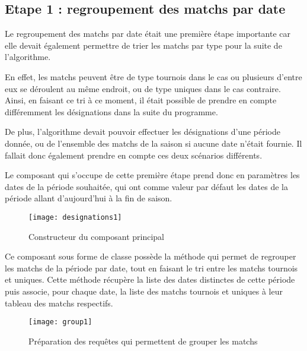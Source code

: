 \subsection{Etape 1 : regroupement des matchs par date}
\vspace{1cm}

Le regroupement des matchs par date était une première étape importante car elle devait également permettre de trier les matchs par type pour la suite de l’algorithme. 

En effet, les matchs peuvent être de type tournois dans le cas ou plusieurs d’entre eux se déroulent au même endroit, ou de type uniques dans le cas contraire. 
Ainsi, en faisant ce tri à ce moment, il était possible de prendre en compte différemment les désignations dans la suite du programme.

De plus, l’algorithme devait pouvoir effectuer les désignations d’une période donnée, ou de l’ensemble des matchs de la saison si aucune date n’était fournie. Il fallait donc également prendre en compte ces deux scénarios différents.

Le composant qui s’occupe de cette première étape prend donc en paramètres les dates de la période souhaitée, qui ont comme valeur par défaut les dates de la période allant d’aujourd’hui à la fin de saison.

\vspace{1cm}

\begin{figure}[!h]
    \centering
    \texttt{[image: designations1]}
    \caption{Constructeur du composant principal}
\end{figure}

\vspace{1cm}

Ce composant sous forme de classe possède la méthode  qui permet de regrouper les matchs de la période par date, tout en faisant le tri entre les matchs tournois et uniques. 
Cette méthode récupère la liste des dates distinctes de cette période puis associe, pour chaque date, la liste des matchs tournois et uniques à leur tableau des matchs respectifs.

\newpage 

\begin{figure}[!h]
    \centering
    \texttt{[image: group1]}
    \caption{Préparation des requêtes qui permettent de grouper les matchs}
\end{figure}

